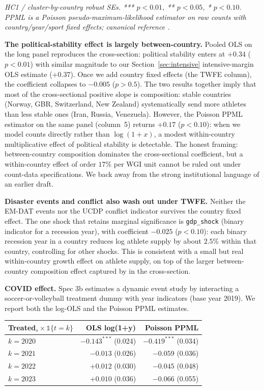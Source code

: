 \documentclass[11pt]{article}
\begin{document}
{\footnotesize\itshape HC1 / cluster-by-country robust SEs. *** $p<0.01$, ** $p<0.05$, * $p<0.10$. PPML is a Poisson pseudo-maximum-likelihood estimator on raw counts with country/year/sport fixed effects; canonical reference \citet{santos2006log}.}

\textbf{The political-stability effect is largely between-country.}
Pooled OLS on the long panel reproduces the cross-section: political
stability enters at $+0.34$ ($p<0.01$) with similar magnitude to our
Section~\ref{sec:intensive} intensive-margin OLS estimate
($+0.37$). Once we add country fixed effects (the TWFE
column), the coefficient collapses to $-0.005$ ($p > 0.5$). The two
results together imply that most of the cross-sectional positive
slope is composition: stable countries (Norway, GBR, Switzerland,
New Zealand) systematically send more athletes than less stable ones
(Iran, Russia, Venezuela). However, the Poisson PPML estimator on
the same panel (column~5) returns $+0.17$ ($p<0.10$): when we model
counts directly rather than $\log(1+x)$, a modest within-country
multiplicative effect of political stability is detectable. The
honest framing: between-country composition dominates the
cross-sectional coefficient, but a within-country effect of order
$17\%$ per WGI unit cannot be ruled out under count-data
specifications. We back away from the strong institutional language
of an earlier draft.

\textbf{Disaster events and conflict also wash out under TWFE.}
Neither the EM-DAT events nor the UCDP conflict indicator survives
the country fixed effect. The one shock that retains marginal
significance is \texttt{gdp\_shock} (binary indicator for a recession
year), with coefficient $-0.025$ ($p<0.10$): each binary recession
year in a country reduces log athlete supply by about $2.5\%$ within
that country, controlling for other shocks. This is consistent with
a small but real within-country growth effect on athlete supply, on
top of the larger between-country composition effect captured by
 in the cross-section.

\textbf{COVID effect.} Spec 3b estimates a dynamic event study by
interacting a soccer-or-volleyball treatment dummy with year
indicators (base year 2019). We report both the log-OLS and the
Poisson PPML estimates.

\begin{center}
\small
\begin{tabular}{lrr}
\toprule
Treated$_s \times \mathbb{1}\{t = k\}$ & OLS log(1+y) & Poisson PPML \\
\midrule
$k = 2020$ & $\mathbf{-0.143^{***}}$ (0.024) & $\mathbf{-0.419^{***}}$ (0.034) \\
$k = 2021$ & $-0.013$ (0.026) & $-0.059$ (0.036) \\
$k = 2022$ & $+0.012$ (0.030) & $-0.045$ (0.048) \\
$k = 2023$ & $+0.010$ (0.036) & $-0.066$ (0.055) \\
\bottomrule
\end{tabular}
\end{center}
\end{document}
